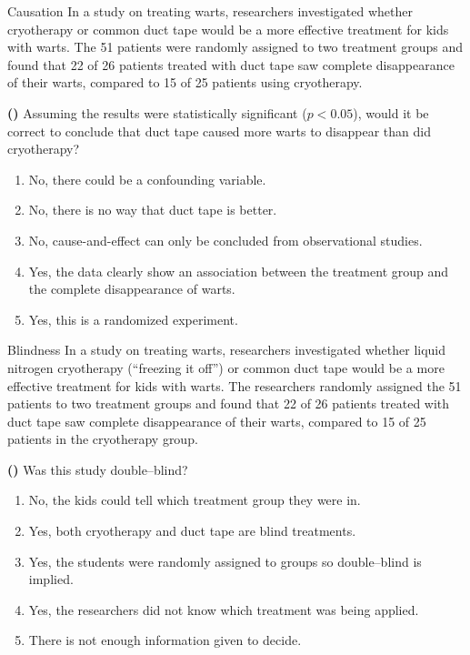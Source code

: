\documentclass[13pt]{beamer}
\newcounter{count}
\newcommand{\question}{ \textbf{(\decimal{count})} \stepcounter{count}}
\newenvironment{click}{\begin{enumerate}[A]}{\end{enumerate}}
\begin{document}
\begin{frame}{Causation}
In a study on treating warts, researchers investigated whether cryotherapy or common duct tape would be a more effective treatment for kids with warts. The 51 patients were randomly assigned to two treatment groups and found that 22 of 26 patients treated with duct tape saw complete disappearance of their warts, compared to 15 of 25 patients using cryotherapy.\smallskip

\question Assuming the results were statistically significant ($p <0.05$), would it be correct to conclude that duct tape caused more warts to disappear than did cryotherapy?

\begin{click}
   \item No, there could be a confounding variable.
   \item No, there is no way that duct tape is better.
   \item No, cause-and-effect can only be concluded from observational studies.
   \item Yes, the data clearly show an association between the treatment group and the complete disappearance of warts.
   \item Yes, this is a randomized experiment.%
\end{click}
\end{frame}

\begin{frame}{Blindness}
In a study on treating warts, researchers investigated whether liquid nitrogen cryotherapy (“freezing it off”) or common duct tape would be a more effective treatment for kids with warts. The researchers randomly assigned the 51 patients to two treatment groups and found that 22 of 26 patients treated with duct tape saw complete disappearance of their warts, compared to 15 of 25 patients in the cryotherapy group.\smallskip

\question Was this study double--blind?

\begin{click}
   \item No, the kids could tell which treatment group they were in.%
   \item Yes, both cryotherapy and duct tape are blind treatments.
   \item Yes, the students were randomly assigned to groups so double--blind is implied.
   \item Yes, the researchers did not know which treatment was being applied.
   \item There is not enough information given to decide.
\end{click}
\end{frame}
\end{document}
